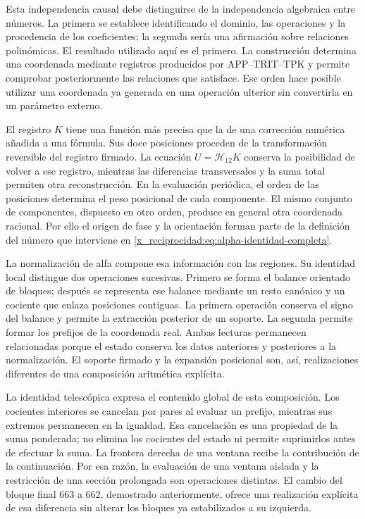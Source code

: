 Esta independencia causal debe distinguirse de la independencia algebraica
entre números. La primera se establece identificando el dominio, las
operaciones y la procedencia de los coeficientes; la segunda sería una
afirmación sobre relaciones polinómicas. El resultado utilizado aquí es el
primero. La construcción determina una coordenada mediante registros
producidos por APP--TRIT--TPK y permite comprobar posteriormente las
relaciones que satisface. Ese orden hace posible utilizar una coordenada ya
generada en una operación ulterior sin convertirla en un parámetro externo.

El registro $K$ tiene una función más precisa que la de una corrección
numérica añadida a una fórmula. Sus doce posiciones proceden de la
transformación reversible del registro firmado. La ecuación
$U=\mathcal H_{12}K$ conserva la posibilidad de volver a ese registro,
mientras las diferencias transversales y la suma total permiten otra
reconstrucción. En la evaluación periódica, el orden de las posiciones
determina el peso posicional de cada componente. El mismo conjunto de
componentes, dispuesto en otro orden, produce en general otra coordenada
racional. Por ello el origen de fase y la orientación forman parte de la
definición del número que interviene en \eqref{x_reciprocidad:eq:alpha-identidad-completa}.

La normalización de alfa compone esa información con las regiones. Su
identidad local distingue dos operaciones sucesivas. Primero se forma el
balance orientado de bloques; después se representa ese balance mediante
un resto canónico y un cociente que enlaza posiciones contiguas. La primera
operación conserva el signo del balance y permite la extracción posterior
de un soporte. La segunda permite formar los prefijos de la coordenada
real. Ambas lecturas permanecen relacionadas porque el estado conserva los
datos anteriores y posteriores a la normalización. El soporte firmado y la
expansión posicional son, así, realizaciones diferentes de una composición
aritmética explícita.

La identidad telescópica expresa el contenido global de esta composición.
Los cocientes interiores se cancelan por pares al evaluar un prefijo,
mientras sus extremos permanecen en la igualdad. Esa cancelación es una
propiedad de la suma ponderada; no elimina los cocientes del estado ni
permite suprimirlos antes de efectuar la suma. La frontera derecha de una
ventana recibe la contribución de la continuación. Por esa razón, la
evaluación de una ventana aislada y la restricción de una sección
prolongada son operaciones distintas. El cambio del bloque final $663$ a
$662$, demostrado anteriormente, ofrece una realización explícita de esa
diferencia sin alterar los bloques ya estabilizados a su izquierda.

